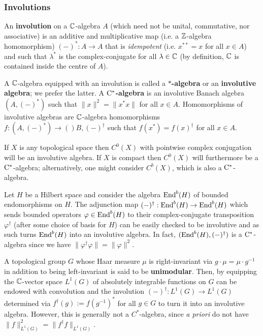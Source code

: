         \subsubsection{Involutions}
            \begin{definition} \label{def: involutions}
                An \textbf{involution} on a $\mathbb{C}$-algebra $A$ (which need not be unital, commutative, nor associative) is an additive and multiplicative map (i.e. a $\mathbb{Z}$-algebra homomorphism) $(-)^*: A \to A$ that is \textit{idempotent} (i.e. $x^{**} = x$ for all $x \in A$) and such that $\lambda^*$ is the complex-conjugate for all $\lambda \in \mathbb{C}$ (by definition, $\mathbb{C}$ is contained inside the centre of $A$).
                
                A $\mathbb{C}$-algebra equipped with an involution is called a \textbf{$*$-algebra} or an \textbf{involutive algebra}; we prefer the latter. A \textbf{$\mathrm{C}^*$-algebra} is an involutive Banach algebra $(A, (-)^*)$ such that $\|x\|^2 = \|x^* x\|$ for all $x \in A$. Homomorphisms of involutive algebras are $\mathbb{C}$-algebra homomorphisms $f: (A, (-)^*) \to ()B, (-)^{\dagger}$ such that $f(x^*) = f(x)^{\dagger}$ for all $x \in A$.
            \end{definition}
            \begin{example} \label{example: continuous_functions_with_complex_conjugation}
                If $X$ is any topological space then $C^0(X)$ with pointwise complex conjugation will be an involutive algebra. If $X$ is compact then $C^0(X)$ will furthermore be a $\mathrm{C}^*$-algebra; alternatively, one might consider $C^b(X)$, which is also a $\mathrm{C}^*$-algebra.
            \end{example}
            \begin{example}
                Let $H$ be a Hilbert space and consider the algebra $\mathrm{End}^b(H)$ of bounded endomorphisms on $H$. The adjunction map $(-)^{\dagger}: \mathrm{End}^b(H) \to \mathrm{End}^b(H)$ which sends bounded operators $\varphi \in \mathrm{End}^b(H)$ to their complex-conjugate transposition $\varphi^{\dagger}$ (after some choice of basis for $H$) can be easily checked to be involutive and as such turns $\mathrm{End}^b(H)$ into an involutive algebra. In fact, $(\mathrm{End}^b(H), (-)^{\dagger})$ is a $\mathrm{C}^*$-algebra since we have $\|\varphi^{\dagger} \varphi\| = \|\varphi\|^2$.
            \end{example}
            \begin{example} 
                A topological group $G$ whose Haar measure $\mu$ is right-invariant via $g \cdot \mu = \mu \cdot g^{-1}$ in addition to being left-invariant is said to be \textbf{unimodular}. Then, by equipping the $\mathbb{C}$-vector space $L^1(G)$ of absolutely integrable functions on $G$ can be endowed with convolution and the involution $(-)^{\dagger}: L^1(G) \to L^1(G)$ determined via $f^{\dagger}(g) := f(g^{-1})^*$ for all $g \in G$ to turn it into an involutive algebra. However, this is generally not a $C^*$-algebra, since \textit{a priori} do not have $\|f\|_{L^1(G)}^2 = \|f^{\dagger} f\|_{L^1(G)}$.
            \end{example}

